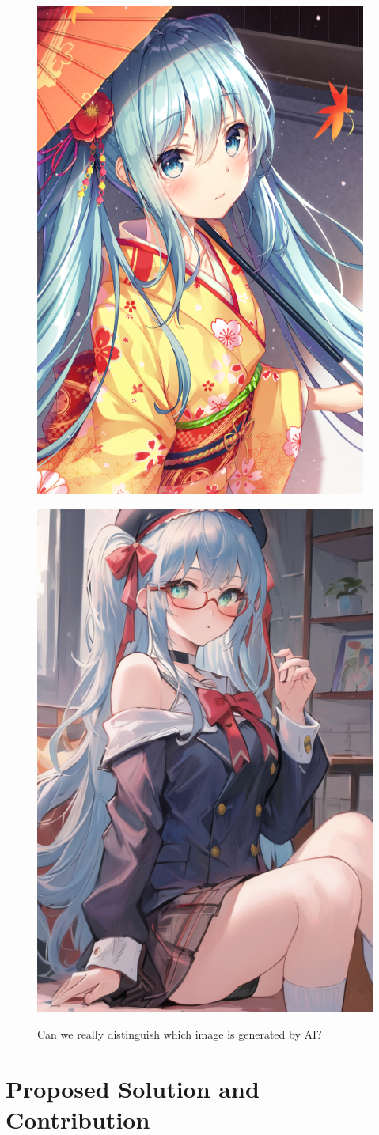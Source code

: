 \documentclass[10pt]{article}
\begin{document}
\begin{figure}[h]
\centering
  \begin{minipage}{.5\textwidth}
    \hspace{0.58\textwidth}
    \includegraphics[width=0.4\linewidth]{miku2.png}
    \label{fig:test1}
  \end{minipage}%
  \begin{minipage}{.5\textwidth}
    \hspace{0.02\textwidth}
    \includegraphics[width=0.4\linewidth]{miku3.jpg}
    \label{fig:test2}
\end{minipage}
\caption{Can we really distinguish which image is generated by AI?}
\end{figure}

\section{Proposed Solution and Contribution}
\end{document}

